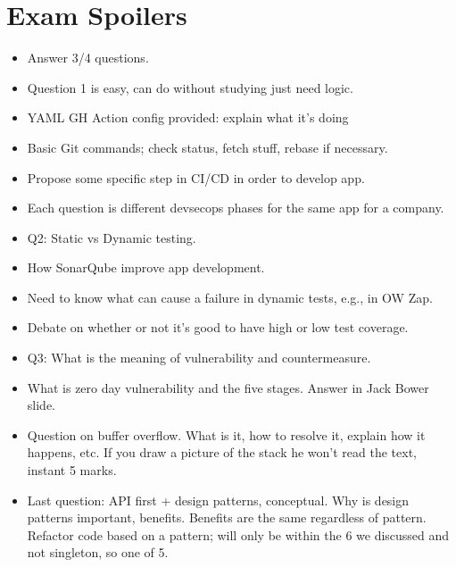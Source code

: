 \documentclass[a4paper,11pt]{article}
\begin{document}
\section{Exam Spoilers}
\begin{itemize}
    \item   Answer 3/4 questions.
    \item   Question 1 is easy, can do without studying just need logic.
    \item   YAML GH Action config provided: explain what it's doing
    \item   Basic Git commands; check status, fetch stuff, rebase if necessary.
    \item   Propose some specific step in CI/CD in order to develop app.
    \item   Each question is different devsecops phases for the same app for a company.
    \item   Q2: Static vs Dynamic testing.
    \item   How SonarQube improve app development.
    \item   Need to know what can cause a failure in dynamic tests, e.g., in OW Zap.
    \item   Debate on whether or not it's good to have high or low test coverage.
    \item   Q3: What is the meaning of vulnerability and countermeasure.
    \item   What is zero day vulnerability and the five stages.
            Answer in Jack Bower slide.
    \item   Question on buffer overflow.
            What is it, how to resolve it, explain how it happens, etc.
            If you draw a picture of the stack he won't read the text, instant 5 marks.
    \item   Last question: API first + design patterns, conceptual.
            Why is design patterns important, benefits.
            Benefits are the same regardless of pattern.
            Refactor code based on a pattern; will only be within the 6 we discussed and not singleton, so one of 5.
\end{itemize}
\end{document}
